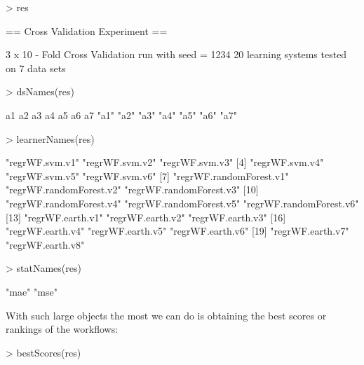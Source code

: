 \documentclass[10pt,a4paper]{article}
\begin{document}
\begin{Schunk}
\begin{Sinput}
> res
\end{Sinput}
\begin{Soutput}
==  Cross Validation  Experiment ==

 3 x 10 - Fold Cross Validation run with seed =  1234 
20  learning systems
tested on  7  data sets
\end{Soutput}
\begin{Sinput}
> dsNames(res)
\end{Sinput}
\begin{Soutput}
  a1   a2   a3   a4   a5   a6   a7 
"a1" "a2" "a3" "a4" "a5" "a6" "a7" 
\end{Soutput}
\begin{Sinput}
> learnerNames(res)
\end{Sinput}
\begin{Soutput}
 [1] "regrWF.svm.v1"          "regrWF.svm.v2"          "regrWF.svm.v3"         
 [4] "regrWF.svm.v4"          "regrWF.svm.v5"          "regrWF.svm.v6"         
 [7] "regrWF.randomForest.v1" "regrWF.randomForest.v2" "regrWF.randomForest.v3"
[10] "regrWF.randomForest.v4" "regrWF.randomForest.v5" "regrWF.randomForest.v6"
[13] "regrWF.earth.v1"        "regrWF.earth.v2"        "regrWF.earth.v3"       
[16] "regrWF.earth.v4"        "regrWF.earth.v5"        "regrWF.earth.v6"       
[19] "regrWF.earth.v7"        "regrWF.earth.v8"       
\end{Soutput}
\begin{Sinput}
> statNames(res)
\end{Sinput}
\begin{Soutput}
[1] "mae" "mse"
\end{Soutput}
\end{Schunk}

With such large objects the most we can do is obtaining the best
scores or rankings of the workflows:

\begin{Schunk}
\begin{Sinput}
> bestScores(res)
\end{Sinput}
\end{Schunk}
\end{document}
